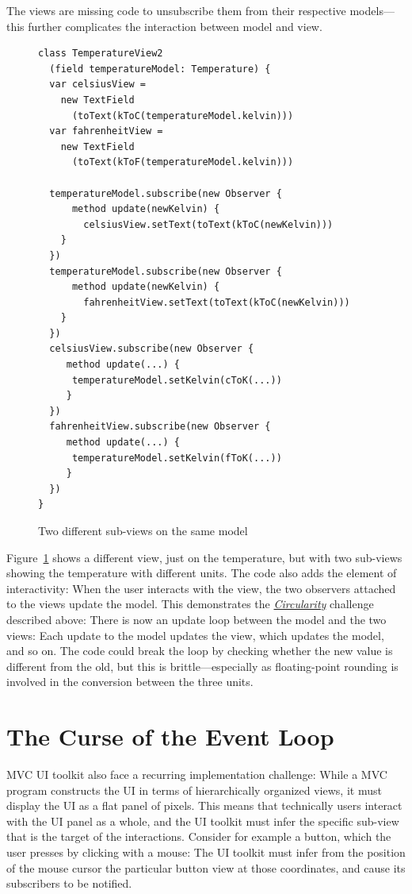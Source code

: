 \documentclass[sigplan,screen]{acmart}
\begin{document}
The views are missing code to unsubscribe them from their
respective models---this further complicates the interaction between
model and view.

\begin{figure}[tb]
\begin{verbatim}
class TemperatureView2
  (field temperatureModel: Temperature) {
  var celsiusView =
    new TextField
      (toText(kToC(temperatureModel.kelvin)))
  var fahrenheitView =
    new TextField
      (toText(kToF(temperatureModel.kelvin)))

  temperatureModel.subscribe(new Observer {
      method update(newKelvin) {
        celsiusView.setText(toText(kToC(newKelvin)))
    }
  })
  temperatureModel.subscribe(new Observer {
      method update(newKelvin) {
        fahrenheitView.setText(toText(kToC(newKelvin)))
    }
  })
  celsiusView.subscribe(new Observer {
     method update(...) {
      temperatureModel.setKelvin(cToK(...))
     }
  })
  fahrenheitView.subscribe(new Observer {
     method update(...) {
      temperatureModel.setKelvin(fToK(...))
     }
  })
}
\end{verbatim}
  \vspace*{-2ex}
  \caption{Two different sub-views on the same model}
  \label{fig:temperature-view2}
\end{figure}
%
Figure~\ref{fig:temperature-view2} shows a different view, just on the
temperature, but with two sub-views showing the temperature with
different units.  The code also adds the element of interactivity:
When the user interacts with the view, the two observers attached to
the views update the model.  This demonstrates the
\hyperlink{challenge:circularity}{\textit{Circularity}} challenge
described above: There is now an update loop between the model and
the two views: Each update to the model updates the view, which
updates the model, and so on.  The code could break the loop by
checking whether the new value is different from the old, but this is brittle---especially as
floating-point rounding is involved in the conversion between the
three units.

\section{The Curse of the Event Loop}
\label{sec:event-loop}

MVC UI toolkit also face a recurring implementation challenge: While a
MVC program constructs the UI in terms of hierarchically organized
views, it must display the UI as a flat panel of pixels.  This means
that technically users interact with the UI panel as a whole, and the
UI toolkit must infer the specific sub-view that is the target of the interactions.
Consider for example a button, which the user presses by clicking with
a mouse: The UI toolkit must infer from the position of the mouse
cursor the particular button view at those coordinates, and cause its
subscribers to be notified.
\end{document}
